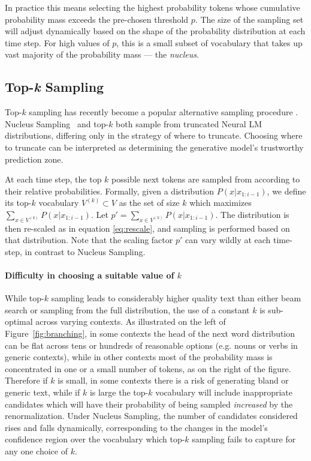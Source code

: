 In practice this means selecting the highest probability tokens whose cumulative probability mass exceeds the pre-chosen threshold $p$. The size of the sampling set will adjust dynamically based on the shape of the probability distribution at each time step. For high values of $p$, this is a small subset of vocabulary that takes up vast majority of the probability mass --- the \emph{nucleus}.

\subsection{Top-\textit{k} Sampling}

Top-$k$ sampling has recently become a popular alternative sampling procedure \citep{fan2018hierarchical,holtzman2018l2w,radford2019BetterLMs}. Nucleus Sampling~ and top-$k$ both sample from truncated Neural LM distributions, differing only in the strategy of where to truncate. Choosing where to truncate can be interpreted as determining the generative model's trustworthy prediction zone.

At each time step, the top $k$ possible next tokens are sampled from according to their relative probabilities. Formally, given a distribution $P(x | x_{1:i-1})$, we define its top-$k$ vocabulary $V^{(k)} \subset V$ as the set of size $k$ which maximizes $\sum_{x \in V^{(k)}} P(x | x_{1:i-1})$. Let $p' = \sum_{x \in V^{(k)}} P(x | x_{1:i-1})$. The distribution is then re-scaled as in equation \ref{eq:rescale}, and sampling is performed based on that distribution. Note that the scaling factor $p'$ can vary wildly at each time-step, in contrast to Nucleus Sampling.

\paragraph{Difficulty in choosing a suitable value of $k$} While top-$k$ sampling leads to considerably higher quality text than either beam search or sampling from the full distribution, the use of a constant $k$ is sub-optimal across varying contexts. As illustrated on the left of Figure~\ref{fig:branching}, in some contexts the head of the next word distribution can be flat across tens or hundreds of reasonable options (e.g. nouns or verbs in generic contexts), while in other contexts most of the probability mass is concentrated in one or a small number of tokens, as on the right of the figure. Therefore if $k$ is small, in some contexts there is a risk of generating bland or generic text, while if $k$ is large the top-$k$ vocabulary will include inappropriate candidates which will have their probability of being sampled \emph{increased} by the renormalization. Under Nucleus Sampling, the number of candidates considered rises and falls dynamically, corresponding to the changes in the model's confidence region over the vocabulary which top-$k$ sampling fails to capture for any one choice of $k$.

